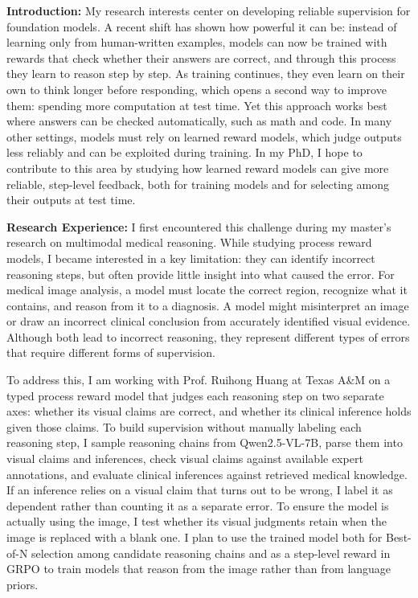 \documentclass{article}
\begin{document}
\textbf{Introduction:} My research interests center on developing reliable supervision for foundation models. A recent shift has shown how powerful it can be: instead of learning only from human-written examples, models can now be trained with rewards that check whether their answers are correct, and through this process they learn to reason step by step. As training continues, they even learn on their own to think longer before responding, which opens a second way to improve them: spending more computation at test time. Yet this approach works best where answers can be checked automatically, such as math and code. In many other settings, models must rely on learned reward models, which judge outputs less reliably and can be exploited during training. In my PhD, I hope to contribute to this area by studying how learned reward models can give more reliable, step-level feedback, both for training models and for selecting among their outputs at test time.





\textbf{Research Experience:} I first encountered this challenge during my master’s research on multimodal medical reasoning. While studying process reward models, I became interested in a key limitation: they can identify incorrect reasoning steps, but often provide little insight into what caused the error. For medical image analysis, a model must locate the correct region, recognize what it contains, and reason from it to a diagnosis. A model might misinterpret an image or draw an incorrect clinical conclusion from accurately identified visual evidence. Although both lead to incorrect reasoning, they represent different types of errors that require different forms of supervision.

To address this, I am working with Prof. Ruihong Huang at Texas A\&M on a typed process reward model that judges each reasoning step on two separate axes: whether its visual claims are correct, and whether its clinical inference holds given those claims. To build supervision without manually labeling each reasoning step, I sample reasoning chains from Qwen2.5-VL-7B, parse them into visual claims and inferences, check visual claims against available expert annotations, and evaluate clinical inferences against retrieved medical knowledge. If an inference relies on a visual claim that turns out to be wrong, I label it as dependent rather than counting it as a separate error. To ensure the model is actually using the image, I test whether its visual judgments retain when the image is replaced with a blank one. I plan to use the trained model both for Best-of-N selection among candidate reasoning chains and as a step-level reward in GRPO to train models that reason from the image rather than from language priors.
\end{document}

